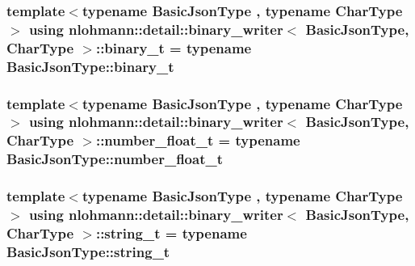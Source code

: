 \subsubsection[{\texorpdfstring{binary\+\_\+t}{binary_t}}]{\setlength{\rightskip}{0pt plus 5cm}template$<$typename Basic\+Json\+Type , typename Char\+Type $>$ using {\bf nlohmann\+::detail\+::binary\+\_\+writer}$<$ Basic\+Json\+Type, Char\+Type $>$\+::{\bf binary\+\_\+t} =  typename Basic\+Json\+Type\+::binary\+\_\+t\hspace{0.3cm}{\ttfamily [private]}}\hypertarget{classnlohmann_1_1detail_1_1binary__writer_a3169b4f7abb773ea30348770629c53e8}{}\label{classnlohmann_1_1detail_1_1binary__writer_a3169b4f7abb773ea30348770629c53e8}
\subsubsection[{\texorpdfstring{number\+\_\+float\+\_\+t}{number_float_t}}]{\setlength{\rightskip}{0pt plus 5cm}template$<$typename Basic\+Json\+Type , typename Char\+Type $>$ using {\bf nlohmann\+::detail\+::binary\+\_\+writer}$<$ Basic\+Json\+Type, Char\+Type $>$\+::{\bf number\+\_\+float\+\_\+t} =  typename Basic\+Json\+Type\+::number\+\_\+float\+\_\+t\hspace{0.3cm}{\ttfamily [private]}}\hypertarget{classnlohmann_1_1detail_1_1binary__writer_abb4b7c621d0cb7633b5806c603f3c51a}{}\label{classnlohmann_1_1detail_1_1binary__writer_abb4b7c621d0cb7633b5806c603f3c51a}
\subsubsection[{\texorpdfstring{string\+\_\+t}{string_t}}]{\setlength{\rightskip}{0pt plus 5cm}template$<$typename Basic\+Json\+Type , typename Char\+Type $>$ using {\bf nlohmann\+::detail\+::binary\+\_\+writer}$<$ Basic\+Json\+Type, Char\+Type $>$\+::{\bf string\+\_\+t} =  typename Basic\+Json\+Type\+::string\+\_\+t\hspace{0.3cm}{\ttfamily [private]}}\hypertarget{classnlohmann_1_1detail_1_1binary__writer_a29f2ae7a5c4a8c1dae47b3b2310de8a8}{}\label{classnlohmann_1_1detail_1_1binary__writer_a29f2ae7a5c4a8c1dae47b3b2310de8a8}


